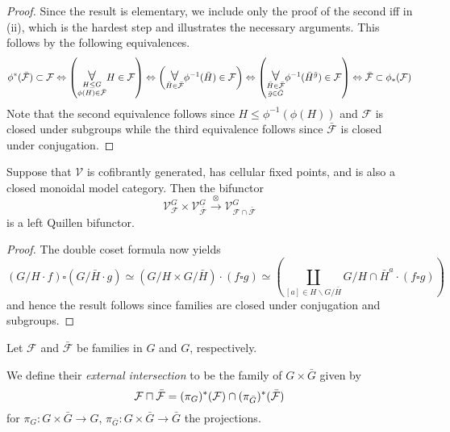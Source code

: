 \documentclass[a4paper,10pt]{article}%
\begin{document}
\begin{proof}
	Since the result is elementary, we include only the proof of the second iff in (ii), which is the hardest step and illustrates the necessary arguments. This follows by the following equivalences.
\[
	\phi^{\**} (\bar{\mathcal{F}}) \subset \mathcal{F}
\Leftrightarrow
	\left( \underset{ \substack{H \leq G \\ \phi(H) \in \bar{\mathcal{F}} }}{\mathlarger{\mathlarger{\forall}}} 
	H \in \mathcal{F} \right)
\Leftrightarrow
	\left( \underset{\bar{H} \in \bar{\mathcal{F}}}{\mathlarger{\mathlarger{\forall}}}
	\phi^{-1}(\bar{H}) \in \mathcal{F}
	\right)
\Leftrightarrow
	\left( \underset{ \substack{\bar{H} \in \bar{\mathcal{F}}\\\bar{g} \in \bar{G}}}{\mathlarger{\mathlarger{\forall}}}
	\phi^{-1}(\bar{H}^{\bar{g}}) \in \mathcal{F}
	\right)
\Leftrightarrow
        \bar{\mathcal F} \subset \phi_{\**}(\mathcal F)
\]
Note that the second equivalence follows since 
$H \leq \phi^{-1}(\phi(H))$ and $\mathcal{F}$ is closed under subgroups while the third equivalence follows since 
$\bar{\mathcal{F}}$ is closed under conjugation. 
\end{proof}


\begin{proposition}\label{BIQUILLENG PROP}
	Suppose that $\mathcal{V}$ is cofibrantly generated, has cellular fixed points, and is also a closed monoidal model category. 	
	Then the bifunctor
\begin{equation}\label{BIQUILLENG EQ}
	\mathcal{V}^G_{\mathcal{F}}
		\times
	\mathcal{V}^G_{\bar{\mathcal{F}}}
		\xrightarrow{\otimes}
	\mathcal{V}^G_{\mathcal{F} \cap \bar{\mathcal{F}}}
\end{equation}
	is a left Quillen bifunctor.
\end{proposition}


\begin{proof}
	The double coset formula now yields
\begin{equation}
	\left(G/H \cdot f\right) \square \left(G/\bar{H} \cdot g\right)
		\simeq
	\left(G/H \times G/\bar{H}\right) \cdot \left(f \square g\right)
		\simeq
	\left(
		\coprod_{[a]\in H \backslash G /\bar{H}}
		{G/H\cap \bar{H}^a} \cdot (f \square g)
	\right)
\end{equation}
and hence the result follows since families are closed under conjugation and subgroups.
\end{proof}


\begin{definition}\label{EXTERINT DEF}
Let $\mathcal{F}$ and $\bar{\mathcal{F}}$ be families in $G$ and $G$, respectively.

We define their \textit{external intersection} to be the 
family of $G \times \bar{G}$ given by
\[
	\mathcal{F} \sqcap \bar{\mathcal{F}}
=
	(\pi_{G})^{\**} (\mathcal{F}) 
		\cap
	(\pi_{\bar{G}})^{\**} (\bar{\mathcal{F}})
\]
for 
$\pi_G \colon G \times \bar{G} \to G$,
$\pi_{\bar{G}} \colon G \times \bar{G} \to \bar{G}$
the projections.
\end{definition}
\end{document}
